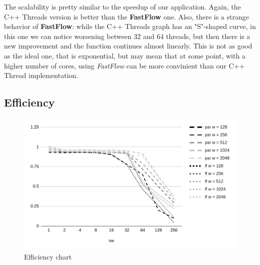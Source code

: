 \noindent
The scalability is pretty similar to the speedup of our application. Again, the C++ Threads version is better than the \textbf{FastFlow} one. Also, there is a strange behavior of \textbf{FastFlow}: while the C++ Threads graph has an "S"-shaped curve, in this one we can notice worsening between $32$ and $64$ threads, but then there is a new improvement and the function continues almost linearly. This is not as good as the ideal one, that is exponential, but may mean that at some point, with a higher number of cores, using \textit{FastFlow} can be more convinient than our C++ Thread implementation.



\subsection{Efficiency}
\begin{figure}[H]
    \centering
    \includegraphics[width=.8\linewidth]{assets/efficiency}
    \caption{Efficiency chart}
    \label{fig:efficiency}
\end{figure}